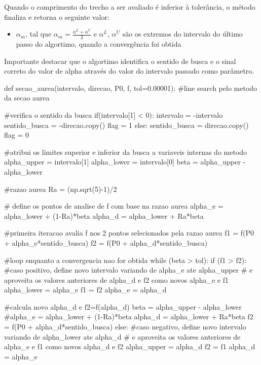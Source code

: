 \documentclass[10pt, a4paper]{article}
\begin{document}
Quando o comprimento do trecho a ser avaliado é inferior à tolerância, o método finaliza e retorna o seguinte valor:

\begin{itemize}
  \item $\alpha_{m}$, tal que $\alpha_{m} = \frac{\alpha^L + \alpha^U}{2}$ e $\alpha^L$, $\alpha^U$ são os extremos do
  intervalo do último passo do algortimo, quando a convergência foi obtida
\end{itemize} 

Importante destacar que o algortimo identifica o sentido de busca e
o sinal correto do valor de alpha através do valor do intervalo passado como parâmetro.


\begin{python}

def secao_aurea(intervalo, direcao, P0, f, tol=0.00001):
    #line search pelo metodo da secao aurea
    
    #verifica o sentido da busca
    if(intervalo[1] < 0):
        intervalo = -intervalo
        sentido_busca = -direcao.copy()
        flag = 1
    else:
        sentido_busca = direcao.copy()
        flag = 0
    
    #atribui os limites superior e inferior da busca a variaveis internas do metodo
    alpha_upper = intervalo[1]
    alpha_lower = intervalo[0]
    beta = alpha_upper - alpha_lower
    
    #razao aurea
    Ra = (np.sqrt(5)-1)/2
    
    # define os pontos de analise de f com base na razao aurea
    alpha_e = alpha_lower + (1-Ra)*beta
    alpha_d = alpha_lower + Ra*beta 
    
    #primeira iteracao avalia f nos 2 pontos selecionados pela razao aurea
    f1 = f(P0 + alpha_e*sentido_busca)
    f2 = f(P0 + alpha_d*sentido_busca)
    
    #loop enquanto a convergencia nao for obtida
    while (beta > tol):
        if (f1 > f2):
            #caso positivo, define novo intervalo variando de alpha_e ate alpha_upper
            # e aproveita os valores anteriores de alpha_d e f2 como novos alpha_e e f1
            alpha_lower = alpha_e
            f1 = f2
            alpha_e = alpha_d
            
            #calcula novo alpha_d e f2=f(alpha_d)
            beta = alpha_upper - alpha_lower
            #alpha_e = alpha_lower + (1-Ra)*beta
            alpha_d = alpha_lower + Ra*beta 
            f2 = f(P0 + alpha_d*sentido_busca)
        else:
            #caso negativo, define novo intervalo variando de alpha_lower ate alpha_d
            # e aproveita os valores anteriores de alpha_e e f1 como novos alpha_d e f2
            alpha_upper = alpha_d
            f2 = f1
            alpha_d = alpha_e
            

\end{python}
\end{document}
